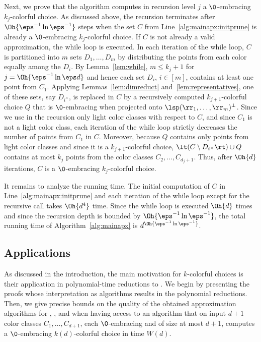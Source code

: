 \begin{prf}
Next, we prove that the algorithm computes in recursion level $j$ a
$\0$-embracing $k_j$-colorful choice. As discussed above, the
recursion terminates after $\Oh{\eps^{-1} \ln \eps^{-1}}$ steps when
the set $C$ from Line~\ref{alg:mainapx:initprune} is already a 
$\0$-embracing $k_j$-colorful choice. If $C$ is not already a 
valid approximation, the while loop is executed. In each 
iteration of the while loop, $C$ is partitioned into $m$ sets
$D_1,\dots,D_m$ by distributing the points from each color 
equally among the $D_i$. By Lemma~\ref{lem:while}, 
$m\leq k_j + 1$ for $j = \Oh{\eps^{-1} \ln \eps d}$
and hence each set $D_i$, $i \in [m]$, contains at least one 
point from $C_1$. Applying Lemmas~\ref{lem:dimreduct} 
and~\ref{lem:representatives}, one of these
sets, say $D_{i^\times}$, is replaced in $C$  by a recursively computed
$k_{j+1}$-colorful choice $Q$
that is $\0$-embracing when projected onto $\lsp(\rr_1,\dots,\rr_m)^\perp$.
Since we use in the recursion only light color classes with
respect to $C$, and since $C_1$ is not a light color class, 
each iteration of the while loop strictly decreases the number of 
points from $C_1$ in $C$.  Moreover, because $Q$ contains 
only points from light color classes and since it
is a $k_{j+1}$-colorful choice, $\lt(C \setminus D_{i^\times}\rt) \cup Q$
contains at most $k_j$ points from the color classes $C_2,\dots,C_{d_j+1}$.
Thus, after $\Oh{d}$ iterations, $C$ is a $\0$-embracing 
$k_j$-colorful choice.

It remains to analyze the running time. The initial computation of $C$ in
Line~\ref{alg:mainapx:initprune} and each iteration of the 
while loop except for the recursive call takes $\Oh{d^4}$ time. 
Since the while loop is executed $\Oh{d}$
times and since the recursion depth is bounded by $\Oh{\eps^{-1} \ln
\eps^{-1}}$, the total running time of Algorithm~\ref{alg:mainapx} is 
$d^{\Oh{\eps^{-1} \ln \eps^{-1}}}$.
\end{prf}

\subsection{Applications}
\label{sec:kcol:applications}

As discussed in the introduction, the main motivation for $k$-colorful
choices is their application in polynomial-time reductions to \CCP. We
begin by presenting the proofs whose interpretation as algorithms 
results in the polynomial reductions. Then, we give precise 
bounds on the quality of the
obtained approximation algorithms for \Centerpoint, \Tverberg, and
\ColKirchberger when having access to an algorithm that on input $d+1$
color classes $C_1,\dots,C_{d+1}$, each $\0$-embracing and of size at 
most $d+1$, computes a $\0$-embracing $k(d)$-colorful choice in time $W(d)$.



